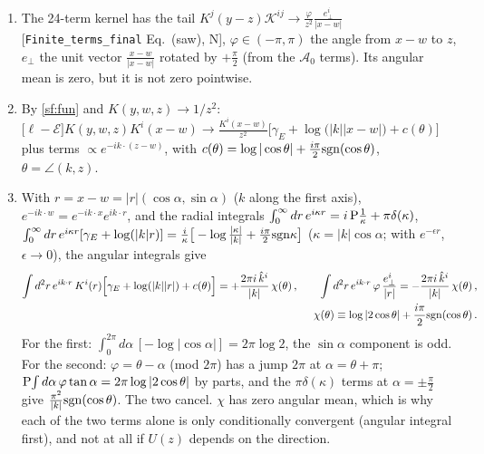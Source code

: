 \begin{enumerate}
\item The 24-term kernel has the tail $K^{j}(y-z)\mathcal{K}^{ij}\to\frac{\varphi}{z^{2}}\frac{e_{\perp}^{i}}{|x-w|}$ [\texttt{Finite\_terms\_final} Eq.~(saw), N], $\varphi\in(-\pi,\pi)$ the angle from $x-w$ to $z$, $e_{\perp}$ the unit vector $\frac{x-w}{|x-w|}$ rotated by $+\frac{\pi}{2}$ (from the $\mathcal{A}_{0}$ terms). Its angular mean is zero, but it is not zero pointwise.
\item By \eqref{sf:fun} and $K(y,w,z)\to1/z^{2}$: $\big[\ell-\mathcal{E}\big]K(y,w,z)K^{i}(x-w)\to\frac{K^{i}(x-w)}{z^{2}}\Big[\gamma_{E}+\log\big(|k||x-w|\big)+c(\theta)\Big]$ plus terms $\propto e^{-ik\cdot(z-w)}$, with $c(\theta)=\log|\cos\theta|+\frac{i\pi}{2}{\rm sgn}(\cos\theta)$, $\theta=\angle(k,z)$.
\item With $r=x-w=|r|(\cos\alpha,\sin\alpha)$ ($k$ along the first axis), $e^{-ik\cdot w}=e^{-ik\cdot x}e^{ik\cdot r}$, and the radial integrals $\int_{0}^{\infty}dr\,e^{i\kappa r}=i\,{\rm P}\frac1\kappa+\pi\delta(\kappa)$, $\int_{0}^{\infty}dr\,e^{i\kappa r}[\gamma_{E}+\log(|k|r)]=\frac{i}{\kappa}\big[-\log\frac{|\kappa|}{|k|}+\frac{i\pi}{2}{\rm sgn}\kappa\big]$ ($\kappa=|k|\cos\alpha$; with $e^{-\epsilon r}$, $\epsilon\to0$), the angular integrals give
\begin{align}
\int d^{2}r\,e^{ik\cdot r}\,K^{i}(r)\Big[\gamma_{E}+\log(|k||r|)+c(\theta)\Big]=+\frac{2\pi i\,\hat k^{i}}{|k|}\,\chi(\theta)\,,\qquad
\int d^{2}r\,e^{ik\cdot r}\,\varphi\,\frac{e_{\perp}^{i}}{|r|}=-\frac{2\pi i\,\hat k^{i}}{|k|}\,\chi(\theta)\,,\notag\\ \chi(\theta)\equiv\log|2\cos\theta|+\frac{i\pi}{2}{\rm sgn}(\cos\theta)\,.\label{sf:id}
\end{align}
For the first: $\int_{0}^{2\pi}d\alpha\,[-\log|\cos\alpha|]=2\pi\log2$, the $\sin\alpha$ component is odd. For the second: $\varphi=\theta-\alpha$ (mod $2\pi$) has a jump $2\pi$ at $\alpha=\theta+\pi$; ${\rm P}\!\int d\alpha\,\varphi\tan\alpha=2\pi\log|2\cos\theta|$ by parts, and the $\pi\delta(\kappa)$ terms at $\alpha=\pm\frac{\pi}{2}$ give $\frac{\pi^{2}}{|k|}{\rm sgn}(\cos\theta)$. The two cancel. $\chi$ has zero angular mean, which is why each of the two terms alone is only conditionally convergent (angular integral first), and not at all if $U(z)$ depends on the direction.
\end{enumerate}

